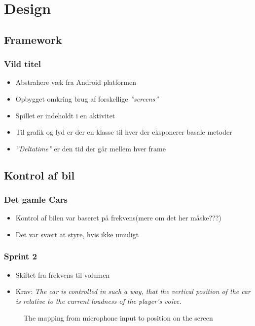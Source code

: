 \section{Design}


\subsection{Framework}
\begin{frame}
\frametitle{Vild titel}
\begin{itemize}
\item Abstrahere væk fra Android platformen
\item Opbygget omkring brug af forskellige \textit{''screens''}
\item Spillet er indeholdt i en aktivitet
\item Til grafik og lyd er der en klasse til hver der eksponerer basale metoder
\item \textit{''Deltatime''} er den tid der går mellem hver frame
\end{itemize}
\end{frame}


\subsection{Kontrol af bil}
\begin{frame}
\frametitle{Det gamle Cars}
\begin{itemize}
\item Kontrol af bilen var baseret på frekvens(mere om det her måske???)
\item Det var svært at styre, hvis ikke umuligt
\end{itemize}
\end{frame}

\begin{frame}
\frametitle{Sprint 2}
\begin{itemize}
\item Skiftet fra frekvens til volumen
\item Krav: \textit{The car is controlled in such a way,
that the vertical position of the car is relative
to the current loudness of the player's voice.}
\end{itemize}
\begin{figure}
\centering

\caption{The mapping from microphone input to position on the screen}
\end{figure}
\end{frame}

